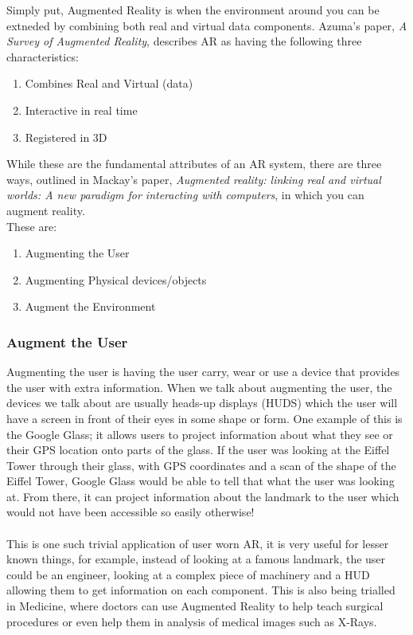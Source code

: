 \documentclass[11pt]{article}
\begin{document}
Simply put, Augmented Reality is when the environment around you can be 
extneded by combining both real and virtual data components. Azuma's 
paper\cite{Azuma97}, \textit{A Survey of Augmented Reality},
describes AR as having the following three characteristics:
\begin{enumerate}
	\item Combines Real and Virtual (data) 
	\item Interactive in real time
	\item Registered in 3D
\end{enumerate}

While these are the fundamental attributes of an AR system, there are 
three ways, outlined in Mackay's paper\cite{Mackay}, 
\textit{Augmented reality: linking real and virtual worlds: 
A new paradigm for interacting with computers},
in which you can augment reality.\\
These are:
\begin{enumerate}
	\item Augmenting the User
	\item Augmenting Physical devices/objects
	\item Augment the Environment
\end{enumerate}

\subsubsection{Augment the User} 
Augmenting the user is having the user carry, wear or use a device
that provides the user with extra information. When we talk about augmenting
the user, the devices we talk about are usually
heads-up displays (HUDS) which the user will have a screen in front of their
eyes in some shape or form. One example of this is the Google Glass; it allows
users to project information about what they see or their GPS location onto
parts of the glass. If the user was looking at the Eiffel Tower through their 
glass, with GPS coordinates and a scan of the shape of the Eiffel Tower, 
Google Glass would be able to tell that what the user was looking at. From there,
it can project information about the landmark to the user which would not have
been accessible so easily otherwise! \\
\\
This is one such trivial application of
user worn AR, it is very useful for lesser known things, for example, instead of 
looking at a famous landmark, the user could be an engineer, looking at a 
complex piece of machinery and a HUD allowing them to get information on each
component. This is also being trialled in Medicine, where doctors can use
Augmented Reality to help teach surgical procedures or even help them in
analysis of medical images such as X-Rays.
\end{document}

